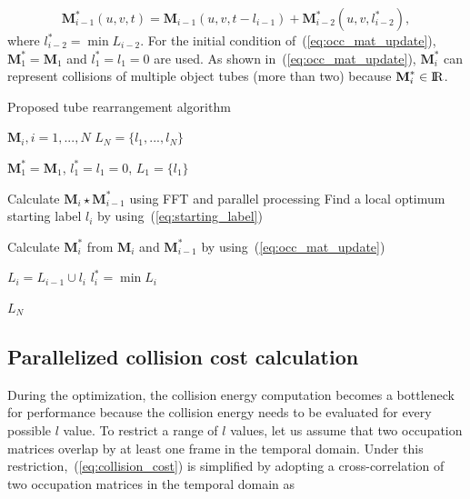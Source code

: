 \documentclass[11pt]{hyu_thesis}
\begin{document}
\begin{equation}
\label{eq:occ_mat_update}
\textbf{M}_{i-1}^{*}(u, v, t) = \textbf{M}_{i-1}(u, v, t - l_{i-1}) + \textbf{M}_{i-2}^{*}(u, v, l_{i-2}^{*}),
\end{equation}
where $l_{i-2}^{*} = \min L_{i-2}$. For the initial condition of~(\ref{eq:occ_mat_update}), $\textbf{M}_{1}^{*} = \textbf{M}_{1}$ and $l_{1}^{*} = l_{1} = 0$ are used. As shown in~(\ref{eq:occ_mat_update}), $\textbf{M}_{i}^{*}$ can represent collisions of multiple object tubes (more than two) because $\textbf{M}_{i}^{*} \in \rm I\!R$. 

\begin{algorithm}[t]
\caption{Proposed tube rearrangement algorithm}
\label{alg:proposed}

\begin{algorithmic}
\REQUIRE $\textbf{M}_{i}, i = 1,...,N$
\ENSURE $L_{N} = \{ l_{1},...,l_{N} \}$

\STATE $\textbf{M}_{1}^{*} = \textbf{M}_{1}$, $l_{1}^{*} = l_{1} = 0$, $L_{1} = \{ l_{1} \}$

	\STATE Calculate $\textbf{M}_{i} \star \textbf{M}_{i-1}^{*}$ using FFT and parallel processing
	\STATE Find a local optimum starting label $l_{i}$ by using~(\ref{eq:starting_label})

	\STATE Calculate $\textbf{M}_{i}^{*}$ from $\textbf{M}_{i}$ and $\textbf{M}_{i-1}^{*}$ by using~(\ref{eq:occ_mat_update})

	\STATE $L_{i} = L_{i-1} \cup l_{i}$
	\STATE $l_{i}^{*} = \min L_{i}$
\ENDFOR

\RETURN $L_{N}$
\end{algorithmic}

\end{algorithm}

\subsection{Parallelized collision cost calculation}
During the optimization, the collision energy computation becomes a bottleneck for performance because the collision energy needs to be evaluated for every possible $l$ value. To restrict a range of $l$ values, let us assume that two occupation matrices overlap by at least one frame in the temporal domain. Under this restriction,~(\ref{eq:collision_cost}) is simplified by adopting a cross-correlation of two occupation matrices in the temporal domain as
\end{document}
